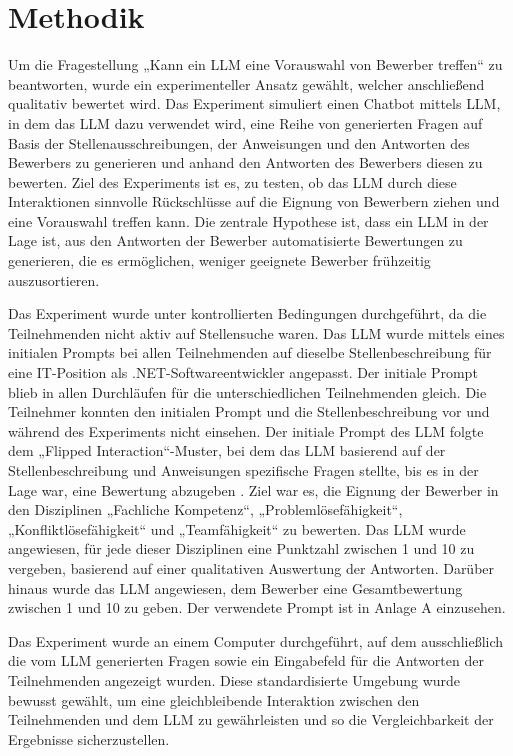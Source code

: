 
\chapter{Methodik}

Um die Fragestellung „Kann ein \ac{LLM} eine Vorauswahl von Bewerber treffen“ zu beantworten, 
wurde ein experimenteller Ansatz gewählt, welcher anschließend qualitativ bewertet wird. 
Das Experiment simuliert einen Chatbot mittels \ac{LLM}, in dem das \ac{LLM} dazu verwendet wird, 
eine Reihe von generierten Fragen auf Basis der Stellenausschreibungen,
der Anweisungen und den Antworten des Bewerbers zu generieren und anhand den Antworten des Bewerbers 
diesen zu bewerten. Ziel des Experiments ist es, zu testen, ob das \ac{LLM} durch diese Interaktionen 
sinnvolle Rückschlüsse auf die Eignung von Bewerbern ziehen und eine Vorauswahl treffen kann. 
Die zentrale Hypothese ist, dass ein \ac{LLM} in der Lage ist, aus den Antworten der Bewerber automatisierte Bewertungen zu generieren, die es ermöglichen, weniger geeignete 
Bewerber frühzeitig auszusortieren. 


Das Experiment wurde unter kontrollierten Bedingungen durchgeführt, da die Teilnehmenden nicht aktiv auf Stellensuche waren. 
Das \ac{LLM} wurde mittels eines initialen Prompts bei allen Teilnehmenden auf dieselbe Stellenbeschreibung 
für eine IT-Position als .NET-Softwareentwickler angepasst. Der initiale Prompt blieb in allen 
Durchläufen für die unterschiedlichen Teilnehmenden gleich. Die Teilnehmer konnten den initialen Prompt und die Stellenbeschreibung vor und während 
des Experiments nicht einsehen. 
Der initiale Prompt des \ac{LLM} folgte dem „Flipped Interaction“-Muster, bei dem das \ac{LLM} basierend 
auf der Stellenbeschreibung und Anweisungen spezifische Fragen stellte, bis es in der Lage war, 
eine Bewertung abzugeben \cite{white2023promptpatterncatalogenhance}. Ziel war es, die Eignung der Bewerber in den Disziplinen 
„Fachliche Kompetenz“, „Problemlösefähigkeit“, „Konfliktlösefähigkeit“ und „Teamfähigkeit“ zu 
bewerten. Das \ac{LLM} wurde angewiesen, für jede dieser Disziplinen eine Punktzahl zwischen 1 und 10 
zu vergeben, basierend auf einer qualitativen Auswertung der Antworten. Darüber hinaus wurde das \ac{LLM} 
angewiesen, dem Bewerber eine Gesamtbewertung zwischen 1 und 10 zu geben. Der verwendete Prompt 
ist in Anlage A einzusehen. 


Das Experiment wurde an einem Computer durchgeführt, auf dem ausschließlich die vom \ac{LLM} 
generierten Fragen sowie ein Eingabefeld für die Antworten der Teilnehmenden angezeigt wurden. 
Diese standardisierte Umgebung wurde bewusst gewählt, um eine gleichbleibende Interaktion zwischen 
den Teilnehmenden und dem \ac{LLM} zu gewährleisten und so die Vergleichbarkeit der Ergebnisse 
sicherzustellen. 


